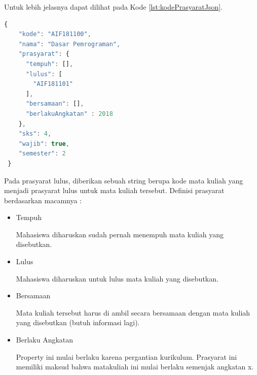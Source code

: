 Untuk lebih jelasnya dapat dilihat pada Kode \ref{lst:kodePrasyaratJson}.
\begin{lstlisting}[language=JavaScript, caption=prasyarat.json\label{lst:kodePrasyaratJson}]
{
    "kode": "AIF181100",
    "nama": "Dasar Pemrograman",
    "prasyarat": {
      "tempuh": [],
      "lulus": [
        "AIF181101"
      ],
      "bersamaan": [],
      "berlakuAngkatan" : 2018
    },
    "sks": 4,
    "wajib": true,
    "semester": 2
 }
\end{lstlisting}

Pada prasyarat lulus, diberikan sebuah string berupa kode mata kuliah yang menjadi prasyarat lulus untuk mata kuliah tersebut.
Definisi prasyarat berdasarkan macamnya :

\begin{itemize}
    \item Tempuh
    
    Mahasiswa diharuskan sudah pernah menempuh mata kuliah yang disebutkan.
    \item Lulus
    
    Mahasiswa diharuskan untuk lulus mata kuliah yang disebutkan.
    \item Bersamaan
    
    Mata kuliah tersebut harus di ambil secara bersamaan dengan mata kuliah yang disebutkan (butuh informasi lagi).
    \item Berlaku Angkatan
    
    Property ini mulai berlaku karena pergantian kurikulum. Prasyarat ini memiliki maksud bahwa matakuliah ini mulai berlaku semenjak angkatan x.
\end{itemize}




